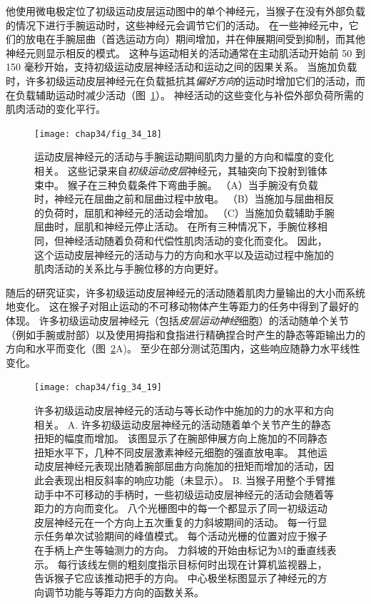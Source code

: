 他使用微电极定位了初级运动皮层运动图中的单个神经元，当猴子在没有外部负载的情况下进行手腕运动时，这些神经元会调节它们的活动。
在一些神经元中，它们的放电在手腕屈曲（首选运动方向）期间增加，并在伸展期间受到抑制，而其他神经元则显示相反的模式。
这种与运动相关的活动通常在主动肌活动开始前 50 到 150 毫秒开始，支持初级运动皮层神经活动和运动之间的因果关系。
当施加负载时，许多初级运动皮层神经元在负载抵抗其\textit{偏好方向}的运动时增加它们的活动，而在负载辅助运动时减少活动（图~\ref{fig:34_18}）。
神经活动的这些变化与补偿外部负荷所需的肌肉活动的变化平行。


\begin{figure}[htbp]
	\centering
	\texttt{[image: chap34/fig\_34\_18]}
	\caption{运动皮层神经元的活动与手腕运动期间肌肉力量的方向和幅度的变化相关。
		这些记录来自\textit{初级运动皮层}神经元，其轴突向下投射到锥体束中。
		猴子在三种负载条件下弯曲手腕。
		（A）当手腕没有负载时，神经元在屈曲之前和屈曲过程中放电。
		（B）当施加与屈曲相反的负荷时，屈肌和神经元的活动会增加。
		（C）当施加负载辅助手腕屈曲时，屈肌和神经元停止活动。
		在所有三种情况下，手腕位移相同，但神经活动随着负荷和代偿性肌肉活动的变化而变化。
		因此，这个运动皮层神经元的活动与力的方向和水平以及运动过程中施加的肌肉活动的关系比与手腕位移的方向更好\cite{evarts1968relation}。}
	\label{fig:34_18}
\end{figure}


随后的研究证实，许多初级运动皮层神经元的活动随着肌肉力量输出的大小而系统地变化。
这在猴子对阻止运动的不可移动物体产生等距力的任务中得到了最好的体现。
许多初级运动皮层神经元（包括\textit{皮层运动神经}细胞）的活动随单个关节（例如手腕或肘部）以及使用拇指和食指进行精确捏合时产生的静态等距输出力的方向和水平而变化（图~\ref{fig:34_19}A)。
至少在部分测试范围内，这些响应随静力水平线性变化。


\begin{figure}[htbp]
	\centering
	\texttt{[image: chap34/fig\_34\_19]}
	\caption{许多初级运动皮层神经元的活动与等长动作中施加的力的水平和方向相关。
		A. 许多初级运动皮层神经元的活动随着单个关节产生的静态扭矩的幅度而增加。
		该图显示了在腕部伸展方向上施加的不同静态扭矩水平下，几种不同皮层激素神经元细胞的强直放电率。
		其他运动皮层神经元表现出随着腕部屈曲方向施加的扭矩而增加的活动，因此会表现出相反斜率的响应功能（未显示）\cite{fetz1980postspike}。
		B. 当猴子用整个手臂推动手中不可移动的手柄时，一些初级运动皮层神经元的活动会随着等距力的方向而变化。
		八个光栅图中的每一个都显示了同一初级运动皮层神经元在一个方向上五次重复的力斜坡期间的活动。
		每一行显示任务单次试验期间的峰值模式。
		每个活动光栅的位置对应于猴子在手柄上产生等轴测力的方向。
		力斜坡的开始由标记为M的垂直线表示。
		每行该线左侧的粗刻度指示目标何时出现在计算机监视器上，告诉猴子它应该推动把手的方向。
		中心极坐标图显示了神经元的方向调节功能与等距力方向的函数关系\cite{sergio2003systematic}。}
	\label{fig:34_19}
\end{figure}



